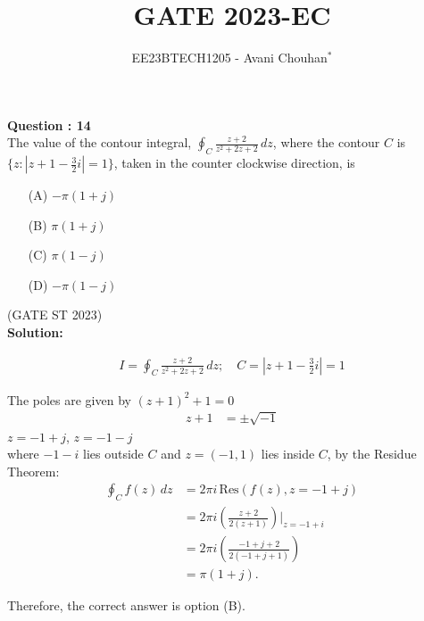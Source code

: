 \documentclass[journal,12pt,twocolumn]{IEEEtran}
\theoremstyle{remark}
\begin{document}

\vspace{3cm}

\title{GATE 2023-EC}
\author{EE23BTECH1205 - Avani Chouhan$^{*}$%
}
\maketitle
\newpage
\bigskip

\renewcommand{\thefigure}{\theenumi}
\renewcommand{\thetable}{\theenumi}

\vspace{3cm}
\textbf{Question : 14} \\
The value of the contour integral, $\oint_C \frac{z + 2}{z^2 + 2z + 2} \, dz$, where the contour $C$ is $\{ z : |z + 1 - \frac{3}{2}i| = 1 \}$, taken in the counter clockwise direction, is \\

\begin{enumerate}
  \item[(A)] $-\pi(1+j) $
  \item[(B)] $\pi(1+j)$
  \item[(C)] $\pi(1-j) $
  \item[(D)] $-\pi(1-j)$
\end{enumerate}

\hfill{(GATE ST 2023)}\\
\textbf{Solution:}

\begin{align}
I = \oint_{C} \frac{z + 2}{z^2 + 2z + 2} \, dz; \quad C = \left| z + 1 - \frac{3}{2}i \right| = 1 
\end{align}

The poles are given by $(z + 1)^2 + 1 = 0$\\
\begin{align}
    z + 1 &= \pm \sqrt{-1}
\end{align}
$z = -1 + j$, $z = -1 - j$\\
where $-1 - i$ lies outside $C$ and $z = (-1, 1)$ lies inside $C$, by the Residue Theorem:
\begin{align}
\oint_C f(z) \, dz &= 2\pi i \, \text{Res}(f(z), z=-1+j) \\
&= 2\pi i \left( \frac{z+2}{2(z+1)} \right) \bigg|_{z=-1+i} \\
&= 2\pi i \left( \frac {-1+j+2} {2(-1+j+1)} \right) \\
&= \pi (1+j).
\end{align}

Therefore, the correct answer is option (B).
\end{document}
